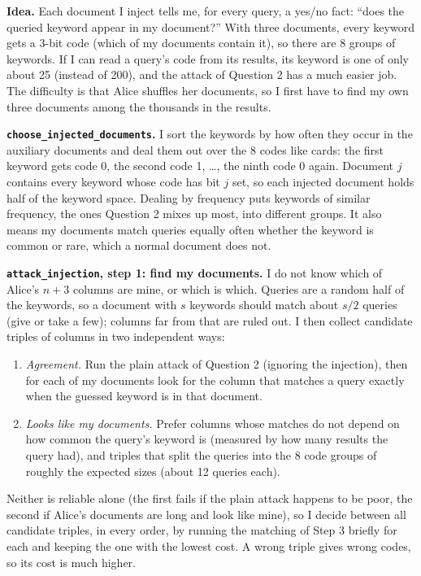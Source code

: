 \documentclass[12pt]{article}
\begin{document}
\begin{answer}
    \textbf{Idea.}
    Each document I inject tells me, for every query, a yes/no fact: ``does the queried keyword appear in my document?''
    With three documents, every keyword gets a 3-bit code (which of my documents contain it), so there are 8 groups of keywords.
    If I can read a query's code from its results, its keyword is one of only about 25 (instead of 200), and the attack of Question 2 has a much easier job.
    The difficulty is that Alice shuffles her documents, so I first have to find my own three documents among the thousands in the results.

    \textbf{\texttt{choose\_injected\_documents}.}
    I sort the keywords by how often they occur in the auxiliary documents and deal them out over the 8 codes like cards: the first keyword gets code 0, the second code 1, \dots, the ninth code 0 again.
    Document $j$ contains every keyword whose code has bit $j$ set, so each injected document holds half of the keyword space.
    Dealing by frequency puts keywords of similar frequency, the ones Question 2 mixes up most, into different groups.
    It also means my documents match queries equally often whether the keyword is common or rare, which a normal document does not.

    \textbf{\texttt{attack\_injection}, step 1: find my documents.}
    I do not know which of Alice's $n+3$ columns are mine, or which is which.
    Queries are a random half of the keywords, so a document with $s$ keywords should match about $s/2$ queries (give or take a few); columns far from that are ruled out.
    I then collect candidate triples of columns in two independent ways:
    \begin{enumerate}
        \item \emph{Agreement.} Run the plain attack of Question 2 (ignoring the injection), then for each of my documents look for the column that matches a query exactly when the guessed keyword is in that document.
        \item \emph{Looks like my documents.} Prefer columns whose matches do not depend on how common the query's keyword is (measured by how many results the query had), and triples that split the queries into the 8 code groups of roughly the expected sizes (about 12 queries each).
    \end{enumerate}
    Neither is reliable alone (the first fails if the plain attack happens to be poor, the second if Alice's documents are long and look like mine), so I decide between all candidate triples, in every order, by running the matching of Step 3 briefly for each and keeping the one with the lowest cost.
    A wrong triple gives wrong codes, so its cost is much higher.


\end{answer}
\end{document}
